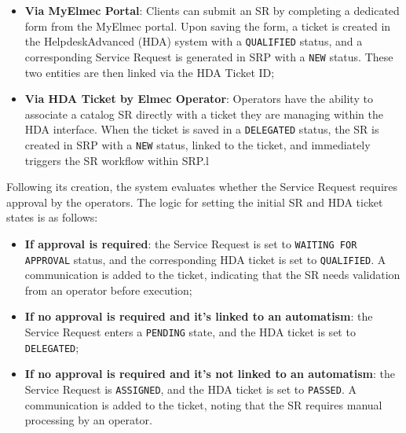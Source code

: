 \begin{itemize}
    \item \textbf{Via MyElmec Portal}: Clients can submit an SR by completing a dedicated form from the MyElmec portal. Upon saving the form, a ticket is created in the HelpdeskAdvanced (HDA) system with a \texttt{QUALIFIED} status, and a corresponding Service Request is generated in SRP with a \texttt{NEW} status. These two entities are then linked via the HDA Ticket ID;
    \item \textbf{Via HDA Ticket by Elmec Operator}: Operators have the ability to associate a catalog SR directly with a ticket they are managing within the HDA interface. When the ticket is saved in a \texttt{DELEGATED} status, the SR is created in SRP with a \texttt{NEW} status, linked to the ticket, and immediately triggers the SR workflow within SRP.l
\end{itemize}

Following its creation, the system evaluates whether the Service Request requires approval by the operators. The logic for setting the initial SR and HDA ticket states is as follows:
\begin{itemize}
    \item \textbf{If approval is required}: the Service Request is set to \texttt{WAITING FOR APPROVAL} status, and the corresponding HDA ticket is set to \texttt{QUALIFIED}. A communication is added to the ticket, indicating that the SR needs validation from an operator before execution;
    \item \textbf{If no approval is required and it's linked to an automatism}: the Service Request enters a \texttt{PENDING} state, and the HDA ticket is set to \texttt{DELEGATED};
    \item \textbf{If no approval is required and it's not linked to an automatism}: the Service Request is \texttt{ASSIGNED}, and the HDA ticket is set to \texttt{PASSED}. A communication is added to the ticket, noting that the SR requires manual processing by an operator.
\end{itemize}

